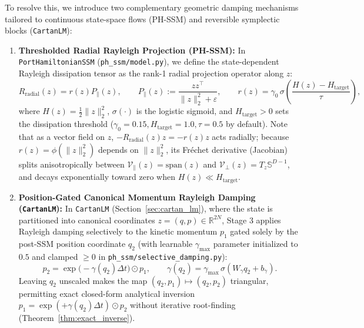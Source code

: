 \documentclass[11pt,a4paper]{article}
\begin{document}
To resolve this, we introduce two complementary geometric damping mechanisms tailored to continuous state-space flows (PH-SSM) and reversible symplectic blocks (\texttt{CartanLM}):
\begin{enumerate}
    \item \textbf{Thresholded Radial Rayleigh Projection (PH-SSM):} In \texttt{PortHamiltonianSSM} (\texttt{ph\_ssm/\allowbreak model.py}), we define the state-dependent Rayleigh dissipation tensor as the rank-1 radial projection operator along $z$:
    \begin{equation}
        R_{\text{radial}}(z) = r(z) P_\parallel(z), \qquad P_\parallel(z) := \frac{z z^\top}{\|z\|_2^2 + \varepsilon}, \qquad r(z) = \gamma_0\,\sigma\left(\frac{H(z) - H_{\text{target}}}{\tau}\right),
        \label{eq:radial_rayleigh_operator}
    \end{equation}
    where $H(z) = \frac{1}{2}\|z\|_2^2$, $\sigma(\cdot)$ is the logistic sigmoid, and $H_{\text{target}} > 0$ sets the dissipation threshold ($\gamma_0=0.15, H_{\text{target}}=1.0, \tau=0.5$ by default). Note that as a vector field on $z$, $-R_{\text{radial}}(z)z = -r(z)z$ acts radially; because $r(z) = \phi(\|z\|_2^2)$ depends on $\|z\|_2^2$, its Fr\'echet derivative (Jacobian) splits anisotropically between $\mathcal{V}_\parallel(z) = \mathrm{span}(z)$ and $\mathcal{V}_\perp(z) = T_z\mathbb{S}^{D-1}$, and decays exponentially toward zero when $H(z) \ll H_{\text{target}}$.
    \item \textbf{Position-Gated Canonical Momentum Rayleigh Damping (\texttt{CartanLM}):} In \texttt{CartanLM} (Section~\ref{sec:cartan_lm}), where the state is partitioned into canonical coordinates $z = (q, p) \in \mathbb{R}^{2N}$, Stage 3 applies Rayleigh damping selectively to the kinetic momentum $p_1$ gated solely by the post-SSM position coordinate $q_2$ (with learnable $\gamma_{\max}$ parameter initialized to $0.5$ and clamped $\ge 0$ in \texttt{ph\_ssm/selective\_damping.py}):
    \begin{equation}
        p_2 = \exp\big(-\gamma(q_2)\Delta t\big) \odot p_1, \qquad \gamma(q_2) = \gamma_{\max}\,\sigma(W_\gamma q_2 + b_\gamma).
        \label{eq:position_gated_momentum_damping}
    \end{equation}
    Leaving $q_2$ unscaled makes the map $(q_2, p_1) \mapsto (q_2, p_2)$ triangular, permitting exact closed-form analytical inversion $p_1 = \exp(+\gamma(q_2)\Delta t) \odot p_2$ without iterative root-finding (Theorem~\ref{thm:exact_inverse}).
\end{enumerate}
\end{document}
